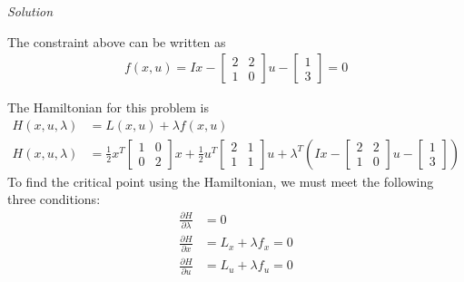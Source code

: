 \documentclass{article}
\begin{document}
  \noindent \textit{Solution} \newline \newline
  
  \noindent The constraint above can be written as
  \begin{align*}
    f(x,u) = Ix - 
  \begin{bmatrix}
    2 & 2 \\
    1 & 0
  \end{bmatrix}u - 
  \begin{bmatrix}
    1 \\
    3
  \end{bmatrix} = 0 \tag{5.3}
  \end{align*}

  \noindent The Hamiltonian for this problem is 
  \begin{align*}
    H(x,u,\lambda) &= L(x,u) + \lambda f(x,u) \\
    H(x,u,\lambda) &= \frac{1}{2}x^T
    \begin{bmatrix}
      1 & 0 \\
      0 & 2
    \end{bmatrix}x + \frac{1}{2}u^T
    \begin{bmatrix}
      2 & 1 \\
      1 & 1
    \end{bmatrix}u + \lambda ^T(Ix - 
    \begin{bmatrix}
      2 & 2 \\
      1 & 0
    \end{bmatrix}u - 
    \begin{bmatrix}
      1 \\
      3
    \end{bmatrix}) \tag{5.4}
  \end{align*}
  To find the critical point using the Hamiltonian, we must meet the following three conditions:
  \begin{align*}
    \frac{\partial H}{\partial \lambda} &= 0 \tag{5.5} \\
    \frac{\partial H}{\partial x} &= L_x + \lambda f_x= 0 \tag{5.6} \\
    \frac{\partial H}{\partial u} &= L_u + \lambda f_u = 0 \tag{5.7} 
  \end{align*}
\end{document}
